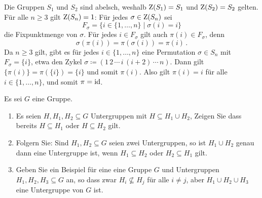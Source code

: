 \begin{solution}
  Die Gruppen $S_1$ und $S_2$ sind abelsch, weshalb $\operatorname{Z}(S_1) = S_1$ und $\operatorname{Z}(S_2) = S_2$ gelten.
  Für alle $n \geq 3$ gilt $\operatorname{Z}(S_n) = 1$:
  Für jedes $\sigma \in \operatorname{Z}(S_n)$ sei
  \[
      F_\sigma
    = \{ i \in \{1, \dotsc, n\} \mid \sigma(i) = i \}
  \]
  die Fixpunktmenge von $\sigma$.
  Für jedes $i \in F_\sigma$ gilt auch $\pi(i) \in F_\sigma$, denn
  \[
      \sigma(\pi(i))
    = \pi(\sigma(i))
    = \pi(i) \,.
  \]
  Da $n \geq 3$ gilt, gibt es für jedes $i \in \{1, \dotsc, n\}$ eine Permutation $\sigma \in S_n$ mit $F_\sigma = \{i\}$, etwa den Zykel $\sigma \coloneqq (1 \, 2 \, \dotsb \, i \, (i+2) \, \dotsb \, n)$.
  Dann gilt $\{\pi(i)\} = \pi(\{i\}) = \{i\}$ und somit $\pi(i)$.
  Also gilt $\pi(i) = i$ für alle $i \in \{1, \dotsc, n\}$, und somit $\pi = \operatorname{id}$.
\end{solution}


\begin{question}[subtitle = Vereinigung von Untergruppen]
  Es sei $G$ eine Gruppe.
  \begin{enumerate}
    \item
      Es seien $H, H_1, H_2 \subseteq G$ Untergruppen mit $H \subseteq H_1 \cup H_2$,
      Zeigen Sie dass bereits $H \subseteq H_1$ oder $H \subseteq H_2$ gilt.
    \item
      Folgern Sie:
      Sind $H_1, H_2 \subseteq G$ seien zwei Untergruppen, so ist $H_1 \cup H_2$ genau dann eine Untergruppe ist, wenn $H_1 \subseteq H_2$ oder $H_2 \subseteq H_1$ gilt.
    \item
      Geben Sie ein Beispiel für eine eine Gruppe $G$ und Untergruppen $H_1, H_2, H_3 \subseteq G$ an, so dass zwar $H_i \nsubseteq H_j$ für alle $i \neq j$, aber $H_1 \cup H_2 \cup H_3$ eine Untergruppe von $G$ ist.
  \end{enumerate}
\end{question}



